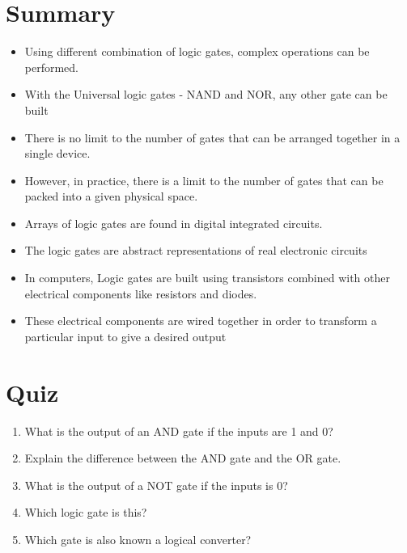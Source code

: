 \documentclass{article}
\begin{document}
		\section{Summary}
			\begin{itemize}
				\item{Using different combination of logic gates, complex operations can be performed.}
				\item{With the Universal logic gates - NAND and NOR, any other gate can be built}
				\item{There is no limit to the number of gates that can be arranged together in a single device.}	
				\item{However, in practice, there is a limit to the number of gates that can be packed into a given physical space.}	 
				\item{Arrays of logic gates are found in digital integrated circuits.}	
				\item{The logic gates are abstract representations of real electronic circuits}
				\item{In computers, Logic gates are built using transistors combined with other electrical components like resistors and diodes.}
				\item{These electrical components are wired together in order to transform a particular input to give a desired output}
				
			\end{itemize}
		\newpage
		\section{Quiz}
			\begin{enumerate}
				\item{What is the output of an AND gate if the inputs are 1 and 0?}
				\item{Explain the difference between the AND gate and the OR gate.}
				\item{What is the output of a NOT gate if the inputs is 0?}
				\item{Which logic gate is this?}
				\item{Which gate is also known a logical converter?}
			\end{enumerate}
		\cite{logicgates2021}
		\cite{logicgates}
		\newpage
			
		
		
		
		
\end{document}
